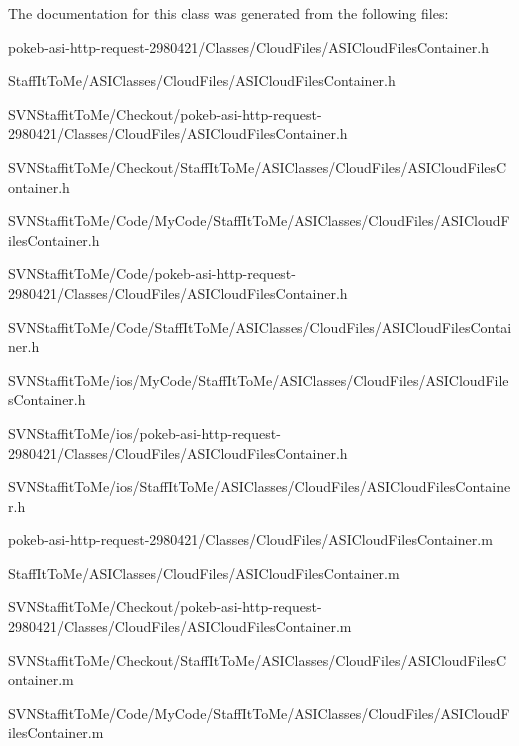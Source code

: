 \-The documentation for this class was generated from the following files\-:\begin{DoxyCompactItemize}
\item 
pokeb-\/asi-\/http-\/request-\/2980421/\-Classes/\-Cloud\-Files/\-A\-S\-I\-Cloud\-Files\-Container.\-h\item 
\-Staff\-It\-To\-Me/\-A\-S\-I\-Classes/\-Cloud\-Files/\-A\-S\-I\-Cloud\-Files\-Container.\-h\item 
\-S\-V\-N\-Staffit\-To\-Me/\-Checkout/pokeb-\/asi-\/http-\/request-\/2980421/\-Classes/\-Cloud\-Files/\-A\-S\-I\-Cloud\-Files\-Container.\-h\item 
\-S\-V\-N\-Staffit\-To\-Me/\-Checkout/\-Staff\-It\-To\-Me/\-A\-S\-I\-Classes/\-Cloud\-Files/\-A\-S\-I\-Cloud\-Files\-Container.\-h\item 
\-S\-V\-N\-Staffit\-To\-Me/\-Code/\-My\-Code/\-Staff\-It\-To\-Me/\-A\-S\-I\-Classes/\-Cloud\-Files/\-A\-S\-I\-Cloud\-Files\-Container.\-h\item 
\-S\-V\-N\-Staffit\-To\-Me/\-Code/pokeb-\/asi-\/http-\/request-\/2980421/\-Classes/\-Cloud\-Files/\-A\-S\-I\-Cloud\-Files\-Container.\-h\item 
\-S\-V\-N\-Staffit\-To\-Me/\-Code/\-Staff\-It\-To\-Me/\-A\-S\-I\-Classes/\-Cloud\-Files/\-A\-S\-I\-Cloud\-Files\-Container.\-h\item 
\-S\-V\-N\-Staffit\-To\-Me/ios/\-My\-Code/\-Staff\-It\-To\-Me/\-A\-S\-I\-Classes/\-Cloud\-Files/\-A\-S\-I\-Cloud\-Files\-Container.\-h\item 
\-S\-V\-N\-Staffit\-To\-Me/ios/pokeb-\/asi-\/http-\/request-\/2980421/\-Classes/\-Cloud\-Files/\-A\-S\-I\-Cloud\-Files\-Container.\-h\item 
\-S\-V\-N\-Staffit\-To\-Me/ios/\-Staff\-It\-To\-Me/\-A\-S\-I\-Classes/\-Cloud\-Files/\-A\-S\-I\-Cloud\-Files\-Container.\-h\item 
pokeb-\/asi-\/http-\/request-\/2980421/\-Classes/\-Cloud\-Files/\-A\-S\-I\-Cloud\-Files\-Container.\-m\item 
\-Staff\-It\-To\-Me/\-A\-S\-I\-Classes/\-Cloud\-Files/\-A\-S\-I\-Cloud\-Files\-Container.\-m\item 
\-S\-V\-N\-Staffit\-To\-Me/\-Checkout/pokeb-\/asi-\/http-\/request-\/2980421/\-Classes/\-Cloud\-Files/\-A\-S\-I\-Cloud\-Files\-Container.\-m\item 
\-S\-V\-N\-Staffit\-To\-Me/\-Checkout/\-Staff\-It\-To\-Me/\-A\-S\-I\-Classes/\-Cloud\-Files/\-A\-S\-I\-Cloud\-Files\-Container.\-m\item 
\-S\-V\-N\-Staffit\-To\-Me/\-Code/\-My\-Code/\-Staff\-It\-To\-Me/\-A\-S\-I\-Classes/\-Cloud\-Files/\-A\-S\-I\-Cloud\-Files\-Container.\-m\item 

\end{DoxyCompactItemize}
